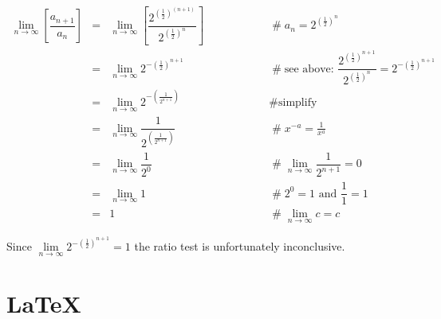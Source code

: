 \documentclass{article}
\theoremstyle{definition}
\begin{document}
\begin{equation*}
\begin{array}{llll}
\lim\limits_{n \to \infty} \left [  \dfrac{a_{n+1}}{a_n} \right ]
&=&
\lim\limits_{n \to \infty} \left [  \dfrac{2^{{ \left ( \tfrac{1}{2} \right ) }^{(n+1)}}} {2^{{ \left (\tfrac{1}{2} \right )}^n}}  \right ]
				&\qquad \qquad \quad \mathrel{\#} a_n = 2^{{ \left (\tfrac{1}{2} \right )}^{n}} \\
[12pt]
&=&  \lim\limits_{n \to \infty} 2^{- {\left (\tfrac{1}{2} \right )}^{n+1}} 
				&\qquad \qquad \quad \mathrel{\#} \text{see above: 
				$\dfrac{2^{{ \left ( \tfrac{1}{2} \right ) }^{n+1}}} {2^{{ \left (\tfrac{1}{2} \right )}^n}} 
				= 2^{- {\left (\tfrac{1}{2} \right )}^{n+1}}$} \\
[15pt]
&=&  \lim\limits_{n \to \infty}  2^{- {\left ( \tfrac{1}{2^{n+1}} \right )}} 
				&\qquad \qquad \quad \mathrel{\#} \text{simplify} \\
[18pt]
&=&  \lim\limits_{n \to \infty}  \dfrac{1}{2^{\left ( \tfrac{1}{2^{n+1}} \right ) }} 
				&\qquad \qquad \quad \mathrel{\#} x^{-a} = \tfrac{1}{x^a}  \\
[18pt]
&=&  \lim\limits_{n \to \infty}  \dfrac{1}{2^0}
				&\qquad \qquad \quad \mathrel{\#} \lim\limits_{n \to \infty} \dfrac{1}{2^{n+1}} = 0 \\
[18pt]
&=&  \lim\limits_{n \to \infty} 1 
				&\qquad \qquad \quad \mathrel{\#} 2^0 = 1 \text{ and }  \dfrac{1}{1} = 1  \\
[15pt]
&=& 1
				&\qquad \qquad \quad \mathrel{\#} \lim\limits_{n \to \infty} c = c

\end{array}
\end{equation*}

\bigskip
\noindent
Since $\lim\limits_{n \to \infty} 2^{- {\left (\tfrac{1}{2}
\right )}^{n+1}} \!\! = 1$ the ratio test is unfortunately
inconclusive.

%
%
\section*{\LaTeX}
%
%
%


%
%
\end{document}
